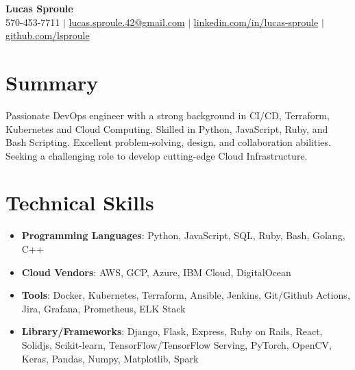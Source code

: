 \documentclass[letterpaper,10pt]{article}
\newcommand{\resumeItem}[1]{\item\small{#1}}
\newcommand{\resumeSubHeadingList}{\begin{itemize}[leftmargin=0.15in, label={}]}
\newcommand{\resumeSubHeadingListEnd}{\end{itemize}}
\begin{document}
\begin{center}
  \textbf{\Huge Lucas Sproule} \\
  \small 570-453-7711 $|$ \href{mailto:lucas.sproule.42@gmail.com}{lucas.sproule.42@gmail.com} $|$ 
  \href{https://linkedin.com/in/lucas-sproule}{linkedin.com/in/lucas-sproule} $|$
  \href{https://github.com/lsproule}{github.com/lsproule}
\end{center}

\section*{Summary}
Passionate DevOps engineer with a strong background in CI/CD, Terraform, Kubernetes and Cloud Computing. Skilled in Python, JavaScript, Ruby, and Bash Scripting. Excellent problem-solving, design, and collaboration abilities. Seeking a challenging role to develop cutting-edge Cloud Infrastructure.

\section{Technical Skills}
\resumeSubHeadingList
  \resumeItem{\textbf{Programming Languages}: Python, JavaScript, SQL, Ruby, Bash, Golang, C++}
  \resumeItem{\textbf{Cloud Vendors}: AWS, GCP, Azure, IBM Cloud, DigitalOcean}
  \resumeItem{\textbf{Tools}: Docker, Kubernetes, Terraform, Ansible, Jenkins, Git/Github Actions, Jira, Grafana, Prometheus, ELK Stack}
  \resumeItem{\textbf{Library/Frameworks}: Django, Flask, Express, Ruby on Rails, React, Solidjs, Scikit-learn, TensorFlow/TensorFlow Serving, PyTorch, OpenCV, Keras, Pandas, Numpy, Matplotlib, Spark}
\resumeSubHeadingListEnd
\end{document}
